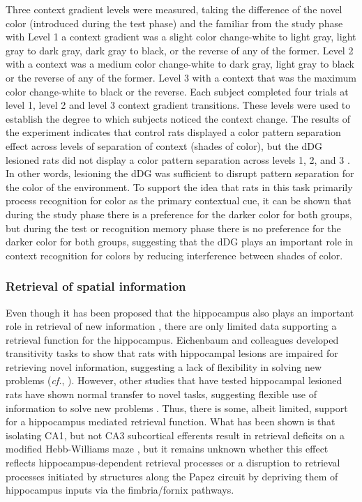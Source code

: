 \documentclass[doc, longtable]{apa6}
\begin{document}
Three context gradient levels were measured, taking the difference of the novel color (introduced during the test phase) and the familiar from the study phase with Level 1 a context gradient was a slight color change-white to light gray, light gray to dark gray, dark gray to black, or the reverse of any of the former. Level 2 with a context was a medium color change-white to dark gray, light gray to black or the reverse of any of the former. Level 3 with a context that was the maximum color change-white to black or the reverse. Each subject completed four trials at level 1, level 2 and level 3 context gradient transitions. These levels were used to establish the degree to which subjects noticed the context change. The results of the experiment indicates that control rats displayed a color pattern separation effect across levels of separation of context (shades of color), but the dDG lesioned rats did not display a color pattern separation across levels 1, 2, and 3 \parencite{kesner2016dentate}. In other words, lesioning the dDG was sufficient to disrupt pattern separation for the color of the environment. To support the idea that rats in this task primarily process recognition for color as the primary contextual cue, it can be shown that during the study phase there is a preference for the darker color for both groups, but during the test or recognition memory phase there is no preference for the darker color for both groups, suggesting that the dDG plays an important role in context recognition for colors by reducing interference between shades of color.

\subsubsection{Retrieval of spatial information}
Even though it has been proposed that the hippocampus also plays an important role in retrieval of new information \parencite{Hirsh1974a}, there are only limited data supporting a retrieval function for the hippocampus. Eichenbaum and colleagues developed transitivity tasks to show that rats with hippocampal lesions are impaired for retrieving novel information, suggesting a lack of flexibility in solving new problems (\textit{cf.}, \cite{Bunsey1996b}). However, other studies that have tested hippocampal lesioned rats have shown normal transfer to novel tasks, suggesting flexible use of information to solve new problems \parencite{Jackson-Smith1993a, DeCoteau1997a, Cho1995b, Walker1984a}. Thus, there is some, albeit limited, support for a hippocampus mediated retrieval function. What has been shown is that isolating CA1, but not CA3 subcortical efferents result in retrieval deficits on a modified Hebb-Williams maze \parencite{hunsaker2008double}, but it remains unknown whether this effect reflects hippocampus-dependent retrieval processes or a disruption to retrieval processes initiated by structures along the Papez circuit by depriving them of hippocampus inputs via the fimbria/fornix pathways.
\end{document}
